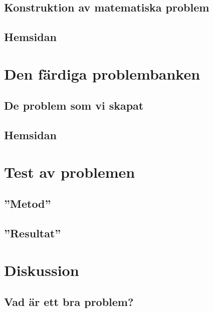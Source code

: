 \documentclass[11pt,a4paper]{article}
\begin{document}
    \subsection{Konstruktion av matematiska problem}
    \label{sec:Skapandetavproblem}
        

    \subsection{Hemsidan}
        
        
\section{Den färdiga problembanken}
        
    
    \subsection{De problem som vi skapat}
        
    
    \subsection{Hemsidan}
        
        
    
\section{Test av problemen}
    
    \subsection{''Metod''}
        
        
    \subsection{''Resultat''}
    \label{sec:slutenkat}

\section{Diskussion}
    
    
    \subsection{Vad är ett bra problem?}
        
        
\end{document}

